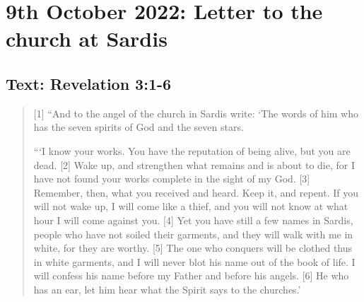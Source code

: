 \section{9th October 2022: Letter to the church at Sardis}
\subsection*{Text: Revelation 3:1-6}
  \begin{quote}
    [1] “And to the angel of the church in Sardis write: ‘The words of him
    who has the seven spirits of God and the seven stars.

    “‘I know your works.  You have the reputation of being alive, but you are
    dead.  [2] Wake up, and strengthen what remains and is about to die, for
    I have not found your works complete in the sight of my God.  [3]
    Remember, then, what you received and heard.  Keep it, and repent.  If
    you will not wake up, I will come like a thief, and you will not know at
    what hour I will come against you.  [4] Yet you have still a few names in
    Sardis, people who have not soiled their garments, and they will walk
    with me in white, for they are worthy.  [5] The one who conquers will be
    clothed thus in white garments, and I will never blot his name out of the
    book of life.  I will confess his name before my Father and before his
    angels.  [6] He who has an ear, let him hear what the Spirit says to the
    churches.’
  \end{quote}

